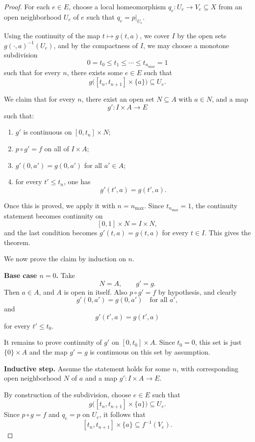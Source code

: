 \documentclass{article}
\begin{document}
\begin{proof}
For each \(e \in E\), choose a local homeomorphism \(q_e:U_e \to V_e \subseteq X\) from an open neighborhood \(U_e\) of \(e\) such that \(q_e = p|_{U_e}\).

Using the continuity of the map \(t \mapsto g(t,a)\), we cover $I$ by the open sets $g(\cdot,a)^{-1}(U_e)$, and by the compactness of $I$, we may choose a monotone subdivision
\[
0=t_0 \le t_1 \le \cdots \le t_{n_{\max}} = 1
\]
such that for every \(n\), there exists some \(e \in E\) such that
\[
g\bigl([t_n,t_{n+1}] \times \{a\}\bigr) \subseteq U_e.
\]

We claim that for every \(n\), there exist an open set \(N \subseteq A\) with $a \in N$, and a map
\[
g' : I \times A \to E
\]
such that:
\begin{enumerate}
  \item \(g'\) is continuous on \([0,t_n]\times N\);
  \item \(p \circ g' = f\) on all of \(I \times A\);
  \item \(g'(0,a') = g(0,a')\) for all \(a' \in A\);
  \item for every \(t' \le t_n\), one has
  \[
  g'(t',a)=g(t',a).
  \]
\end{enumerate}

Once this is proved, we apply it with \(n=n_{\max}\). Since \(t_{n_{\max}}=1\), the continuity statement becomes continuity on
\[
[0,1]\times N = I\times N,
\]
and the last condition becomes \(g'(t,a)=g(t,a)\) for every \(t\in I\). This gives the theorem.

We now prove the claim by induction on \(n\).

\noindent\textbf{Base case \(n=0\).}
Take
\[
N=A,\qquad g'=g.
\]
Then \(a \in A\), and \(A\) is open in itself. Also \(p\circ g'=f\) by hypothesis, and clearly
\[
g'(0,a')=g(0,a') \quad\text{for all } a',
\]
and
\[
g'(t',a)=g(t',a)
\]
for every \(t'\le t_0\).

It remains to prove continuity of \(g'\) on \([0,t_0]\times A\). Since \(t_0=0\), this set is just \(\{0\}\times A\) and the map \(g'=g\) is continuous on this set by assumption.

\noindent\textbf{Inductive step.}
Assume the statement holds for some \(n\), with corresponding open neighborhood \(N\) of \(a\) and a map \(g':I \times A \to E\).

By construction of the subdivision, choose \(e \in E\) such that
\[
g\bigl([t_n,t_{n+1}] \times \{a\}\bigr) \subseteq U_e.
\]
Since \(p\circ g=f\) and \(q_e=p\) on \(U_e\), it follows that
\[
[t_n,t_{n+1}] \times \{a\} \subseteq f^{-1}(V_e).
\]


\end{proof}
\end{document}
